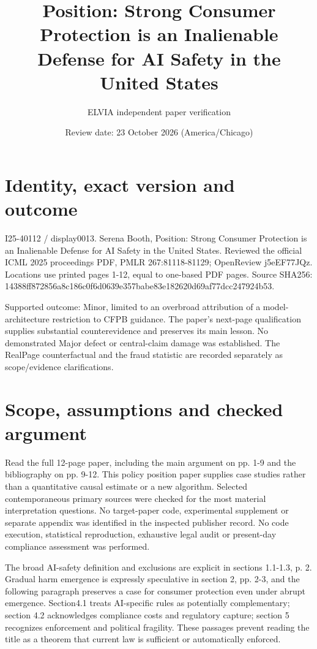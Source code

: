 \documentclass[10pt]{article}
\title{Position: Strong Consumer Protection is an Inalienable Defense for AI Safety in the United States}
\author{ELVIA independent paper verification}
\date{Review date: 23 October 2026 (America/Chicago)}
\begin{document}
\maketitle
\section*{Identity, exact version and outcome}
I25-40112 / display0013. Serena Booth, Position: Strong Consumer Protection is an Inalienable Defense for AI Safety in the United States. Reviewed the official ICML 2025 proceedings PDF, PMLR 267:81118-81129; OpenReview j5eEF77JQz. Locations use printed pages 1-12, equal to one-based PDF pages. Source SHA256: 14388ff872856a8c186c0f6d0639e357babe83e182620d69af77dcc247924b53.\par
Supported outcome: Minor, limited to an overbroad attribution of a model-architecture restriction to CFPB guidance. The paper’s next-page qualification supplies substantial counterevidence and preserves its main lesson. No demonstrated Major defect or central-claim damage was established. The RealPage counterfactual and the fraud statistic are recorded separately as scope/evidence clarifications.\par
\section*{Scope, assumptions and checked argument}
Read the full 12-page paper, including the main argument on pp. 1-9 and the bibliography on pp. 9-12. This policy position paper supplies case studies rather than a quantitative causal estimate or a new algorithm. Selected contemporaneous primary sources were checked for the most material interpretation questions. No target-paper code, experimental supplement or separate appendix was identified in the inspected publisher record. No code execution, statistical reproduction, exhaustive legal audit or present-day compliance assessment was performed.\par
The broad AI-safety definition and exclusions are explicit in sections 1.1-1.3, p. 2. Gradual harm emergence is expressly speculative in section 2, pp. 2-3, and the following paragraph preserves a case for consumer protection even under abrupt emergence. Section4.1 treats AI-specific rules as potentially complementary; section 4.2 acknowledges compliance costs and regulatory capture; section 5 recognizes enforcement and political fragility. These passages prevent reading the title as a theorem that current law is sufficient or automatically enforced.\par
\end{document}
